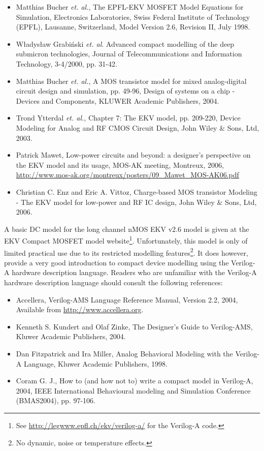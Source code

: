 \begin{itemize}
 \item Matthias Bucher \textit{et. al.}, The EPFL-EKV MOSFET Model Equations for Simulation, Electronics Laboratories, Swiss Federal Institute of Technology (EPFL), Lausanne, Switzerland, Model Version 2.6, Revision II, July 1998.
 \item W\l adys\l aw Grabi\'{n}ski \textit{et. al}. Advanced compact modelling of the deep submicron technologies, Journal of Telecommunications and Information Technology, 3-4/2000, pp. 31-42. 
 \item Matthias Bucher \textit{et. al.}, A MOS transistor model for mixed analog-digital circuit design and simulation, pp. 49-96, Design of systems on a chip - Devices and Components, KLUWER Academic Publishers, 2004.
\item Trond Ytterdal \textit{et. al.}, Chapter 7: The EKV model, pp. 209-220, Device Modeling for Analog and RF CMOS Circuit Design, John Wiley $\&$ Sons, Ltd, 2003.
\item Patrick Mawet, Low-power circuits and beyond: a designer's perspective on the EKV model and its usage, MOS-AK meeting, Montreux, 2006, \url{http://www.mos-ak.org/montreux/posters/09_Mawet_MOS-AK06.pdf}
\item Christian C. Enz and Eric A. Vittoz, Charge-based MOS transistor Modeling - The EKV model for low-power and RF IC design, John Wiley $\&$ Sons, Ltd, 2006.
\end{itemize}
 




A basic DC model for the long channel nMOS EKV v2.6 model is given at
the EKV Compact MOSFET model website\footnote{See
\url{http://legwww.epfl.ch/ekv/verilog-a/} for the Verilog-A
code.}. Unfortunately, this model is only of limited practical use due
to its restricted modelling features\footnote{No dynamic, noise or
temperature effects.}.  It does however, provide a very good
introduction to compact device modelling using the Verilog-A hardware
description language. Readers who are unfamiliar with the Verilog-A
hardware description language should consult the following references:

\begin{itemize}
 \item Accellera, Verilog-AMS Language Reference Manual, Version 2.2, 2004, Available from \url{http://www.accellera.org}.
 \item Kenneth S. Kundert and Olaf Zinke, The Designer's Guide to Verilog-AMS, Kluwer Academic Publishers, 2004.
 \item Dan Fitzpatrick and Ira Miller, Analog Behavioral Modeling with the Verilog-A Language, Kluwer Academic Publishers, 1998.
\item Coram G. J., How to (and how not to) write a compact model in Verilog-A, 2004, IEEE International Behavioural modeling and Simulation Conference (BMAS2004), pp. 97-106.
\end{itemize}

